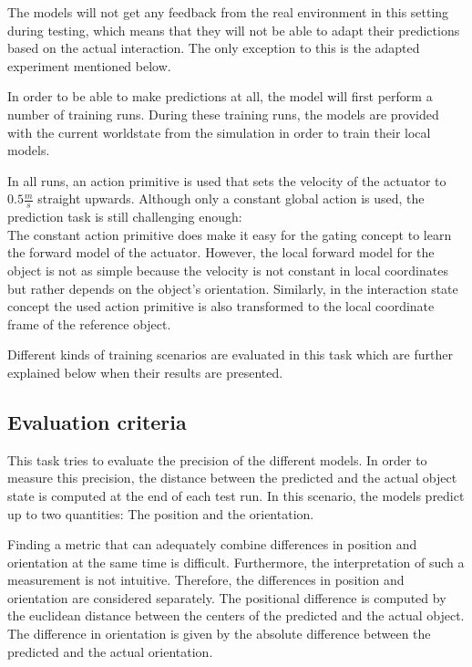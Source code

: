 The models will not get any feedback from the real environment in this setting during testing, which means that they will not be able to adapt their predictions based on the actual interaction. The only exception to this is the adapted experiment mentioned below.

In order to be able to make predictions at all, the model will first perform a number of training runs. During these training runs, the models are provided with the current worldstate from the simulation in order to train their local models.

In all runs, an action primitive is used that sets the velocity of the actuator to $0.5\frac{m}{s}$ straight upwards. Although only a constant global action is used, the prediction task is still challenging enough: \\
The constant action primitive does make it easy for the gating concept to learn the forward model of the actuator. However, the local forward model for the object is not as simple because the velocity is not constant in local coordinates but rather depends on the object's orientation. 
Similarly, in the interaction state concept the used action primitive is also transformed to the local coordinate frame of the reference object.

Different kinds of training scenarios are evaluated in this task which are further explained below when their results are presented.


\subsection{Evaluation criteria}

This task tries to evaluate the precision of the different models. In order to measure this precision, the distance between the predicted and the actual object state is computed at the end of each test run.
In this scenario, the models predict up to two quantities: The position and the orientation. 

Finding a metric that can adequately combine differences in position and orientation at the same time is difficult. Furthermore, the interpretation of such a measurement is not intuitive. Therefore, the differences in position and orientation are considered separately. 
The positional difference is computed by the euclidean distance between the centers of the predicted and the actual object. The difference in orientation is given by the absolute difference between the predicted and the actual orientation.

